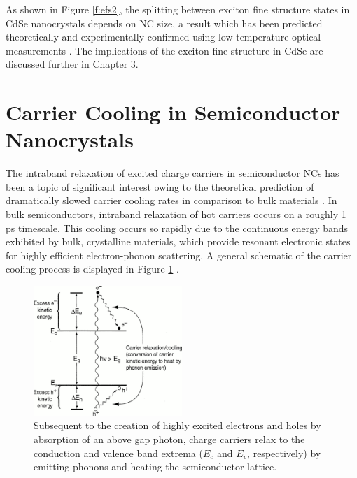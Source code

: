 As shown in Figure \ref{f:efs2}, the splitting between exciton fine structure states in CdSe nanocrystals depends on NC size, a result which has been predicted theoretically and experimentally confirmed using low-temperature optical measurements \cite{PhysRevB.54.4843}. The implications of the exciton fine structure in CdSe are discussed further in Chapter 3.

\section{Carrier Cooling in Semiconductor Nanocrystals}

The intraband relaxation of excited charge carriers in semiconductor NCs has been a topic of significant interest owing to the theoretical prediction of dramatically slowed carrier cooling rates in comparison to bulk materials \cite{benisty1991intrinsic, bockelmann1990phonon}. In bulk semiconductors, intraband relaxation of hot carriers occurs on a roughly 1 ps timescale. This cooling occurs so rapidly due to the continuous energy bands exhibited by bulk, crystalline materials, which provide resonant electronic states for highly efficient electron-phonon scattering.  A general schematic of the carrier cooling process is displayed in Figure \ref{f:carrier_cooling1} \cite{nozik2001spectroscopy}. 

\begin{figure}
\begin{center}
\includegraphics[width=0.5\textwidth]{./Chapter1/carrier_cooling.jpeg}
\caption[Schematic of phonon-assisted intraband carrier cooling in semiconductors.]{Subsequent to the creation of highly excited electrons and holes by absorption of an above gap photon, charge carriers relax to the conduction and valence band extrema ($E_c$ and $E_v$, respectively) by emitting phonons and heating the semiconductor lattice.}
\label{f:carrier_cooling1}
\end{center}
\end{figure}

